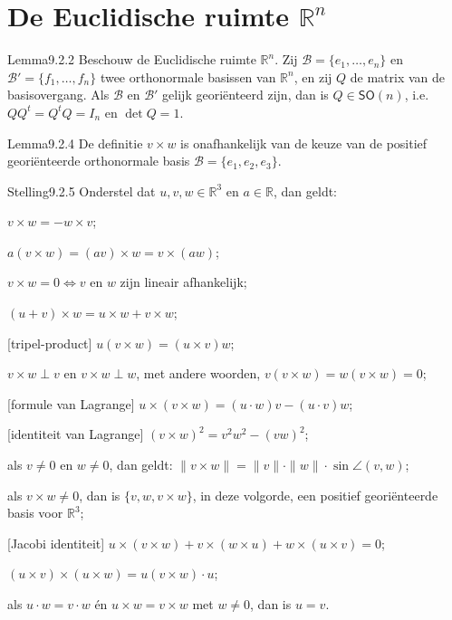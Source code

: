 \section{De Euclidische ruimte $\mathbb R^n$}

\begin{res}{Lemma}{9.2.2}
Beschouw de Euclidische ruimte $\mathbb R^n$. Zij $\mathcal B=\{e_1,\dots,e_n\}$ en $\mathcal B'=\{f_1,\dots,f_n\}$ twee orthonormale basissen van $\mathbb R^n$, en zij $Q$ de matrix van de basisovergang. Als $\mathcal B$ en $\mathcal B'$ gelijk geori\"enteerd zijn, dan is $Q\in \mathsf{SO}(n)$, i.e.\ $QQ^t=Q^tQ=I_n$ en $\det Q=1$.
\end{res}

\begin{res}{Lemma}{9.2.4}
De definitie $v\times w$ is onafhankelijk van de keuze van de positief geori\"enteerde orthonormale basis $\mathcal B=\{e_1,e_2,e_3\}$.
\end{res}

\begin{res}{Stelling}{9.2.5}
Onderstel dat $u,v,w\in\mathbb R^3$ en $a\in\mathbb R$, dan geldt:
\begin{myenum}
\item $v\times w=-w\times v$;
\item $a(v\times w)=(av)\times w=v\times(aw)$;
\item $v\times w=0 \iff v$ en $w$ zijn lineair afhankelijk;
\item $(u+v)\times w=u\times w+v\times w$;
\item \textup{[tripel-product]} $u(v\times w)=(u\times v)w$;
\item $v\times w\perp v$ en $v\times w\perp w$, met andere woorden, $v(v\times w)=w(v\times w)=0$;
\item \textup{[formule van Lagrange]} $u\times(v\times w)=(u\cdot w)v-(u\cdot v)w$;
\item \textup{[identiteit van Lagrange]} $(v\times w)^2=v^2w^2-(vw)^2$;
\item als $v\ne0$ en $w\ne0$, dan geldt: $\|v\times w\|=\|v\|\cdot\|w\|\cdot\sin\angle(v,w)$;
\item als $v\times w\ne0$, dan is $\{v,w,v\times w\}$, in deze volgorde, een positief geori\"enteerde basis voor $\mathbb R^3$;
\item \textup{[Jacobi identiteit]} $u\times(v\times w)+v\times(w\times u)+w\times(u\times v)=0$;
\item $(u\times v)\times(u\times w)=u(v\times w)\cdot u$;
\item als $u\cdot w=v\cdot w$ \'en $u\times w=v\times w$ met $w\ne0$, dan is $u=v$.
\end{myenum}
\end{res}

